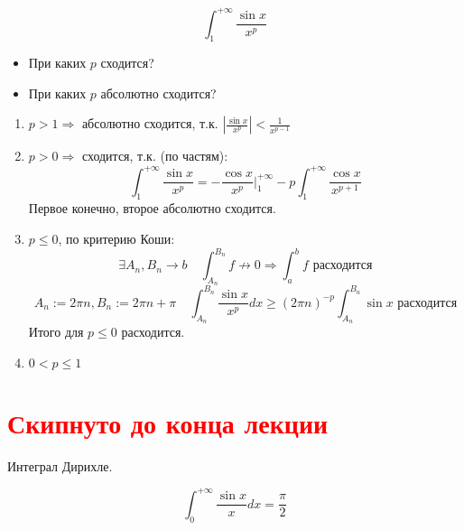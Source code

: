 \begin{example}
    $$\int_1^{+\infty} \frac{\sin x}{x^p}$$
    \begin{itemize}
        \item При каких $p$ сходится?
        \item При каких $p$ абсолютно сходится?
    \end{itemize}
    \begin{enumerate}
        \item $p > 1 \Rightarrow$ абсолютно сходится, т.к. $\left|\frac{\sin x}{x^p}\right|<\frac{1}{x^{p-1}}$
        \item $p > 0 \Rightarrow$ сходится, т.к. (по частям):
        $$\int_1^{+\infty} \frac{\sin x}{x^p} = -\frac{\cos x}{x^p}\bigg|_1^{+\infty} - p \int_1^{+\infty} \frac{\cos x}{x^{p+1}}$$
        Первое конечно, второе абсолютно сходится.
        \item $p \leq 0$, по критерию Коши:
        $$\exists A_n, B_n \to b \quad \int_{A_n}^{B_n} f\not\to0 \Rightarrow \int_a^b f \text{ расходится}$$
        $$A_n:=2\pi n, B_n:=2\pi n+\pi \quad \int_{A_n}^{B_n} \frac{\sin x}{x^p} dx \geq (2\pi n)^{-p}\int_{A_n}^{B_n} \sin x \text{ расходится}$$
        Итого для $p\leq 0$ расходится.
        \item $0<p\leq 1$
    \end{enumerate}
\end{example}

\section*{\textcolor{red}{Скипнуто до конца лекции}}

\begin{example}
    Интеграл Дирихле.

    $$\int_0^{+\infty} \frac{\sin x}{x}dx = \frac{\pi}{2}$$
\end{example}

